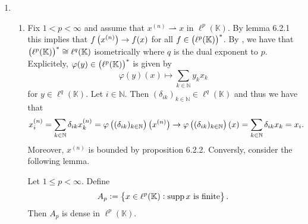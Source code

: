 \begin{enumerate}[label = \textbf{Exercise \arabic*.},wide = 0pt, itemsep = 1.5ex]
		\begin{proof}
			Suppose that $x_n \to y$. Then since $\mathcal{T}_W \subseteq \mathcal{T}_{\norm[0]{\cdot}}$, we have that $x_n \rightharpoonup y$. But $(X,\mathcal{T}_W)$ is Hausdorff and thus limits are unique. Hence $x = y$.
		\end{proof}

		\begin{corollary}
			Let $1 < p < \infty$. Then $g_n$, $h_n$ and $k_n$ do not converge in norm.
		\end{corollary}

		\begin{proof}
			Since all three sequences converge weakly to $0$, we only have to show that they do not converge towards $0$ in $L^p(\mathbb{R})$. However, this is immediate from the first lemma, since all sequences have constant norm $\norm{f}_p \neq 0$ and hence the limit should have also nonzero norm.
		\end{proof}

	\item
		~
		\begin{enumerate}[label = \textbf{\alph*.},wide = 0pt, itemsep = 1.5ex]
			\item Fix $1 < p < \infty$ and assume that $x^{(n)} \rightharpoonup x$ in $\ell^p(\mathbb{K})$. By lemma 6.2.1 this implies that $f\del[1]{x^{(n)}} \to f(x)$ for all $f \in \del[1]{\ell^p(\mathbb{K})}^*$. By \cite[59]{werner:funktionalanalysis:2011}, we have that $\del[1]{\ell^p(\mathbb{K})}^* \cong \ell^q(\mathbb{K})$ isometrically where $q$ is the dual exponent to $p$. Explicitely, $\varphi(y) \in \del[1]{\ell^p(\mathbb{K})}^*$ is given by
				\begin{equation*}
					\varphi(y)(x) \mapsto \sum_{k \in \mathbb{N}} y_kx_k
				\end{equation*}
				\noindent for $y \in \ell^q(\mathbb{K})$. Let $i \in \mathbb{N}$. Then $(\delta_{ik})_{k \in \mathbb{N}} \in \ell^q(\mathbb{K})$ and thus we have that 
				\begin{equation*}
					x^{(n)}_i = \sum_{k \in \mathbb{N}} \delta_{ik}x^{(n)}_k = \varphi\del[1]{(\delta_{ik})_{k \in \mathbb{N}}}\del[1]{x^{(n)}} \to \varphi\del[1]{(\delta_{ik})_{k \in \mathbb{N}}}\del[0]{x} = \sum_{k \in \mathbb{N}} \delta_{ik}x_k = x_i.
				\end{equation*}
				Moreover, $x^{(n)}$ is bounded by proposition 6.2.2. Conversly, consider the following lemma.

				\begin{lemma}
					Let $1 \leq p < \infty$. Define
					\begin{equation*}
						A_p := \cbr{x \in \ell^p(\mathbb{K}) : \supp x \text{ is finite}}.
					\end{equation*}
					Then $A_p$ is dense in $\ell^p(\mathbb{K})$.
				\end{lemma}


\end{enumerate}
\end{enumerate}
